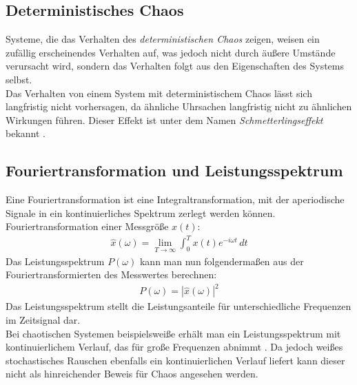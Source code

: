 \subsection{Deterministisches Chaos}
\label{sub:determChaos}
Systeme, die das Verhalten des \textit{deterministischen Chaos} zeigen, weisen ein zufällig erscheinendes Verhalten auf, was jedoch nicht durch äußere Umstände verursacht wird, sondern das Verhalten folgt aus den Eigenschaften des Systems selbst.\\
Das Verhalten von einem System mit deterministischem Chaos lässt sich langfristig nicht vorhersagen, da ähnliche Uhrsachen langfristig nicht zu ähnlichen Wirkungen führen. Dieser Effekt ist unter dem Namen \textit{Schmetterlingseffekt} bekannt \citep{WikiDetChaos}.

\subsection{Fouriertransformation und Leistungsspektrum}
\label{sub:fouriertrafo}
Eine Fouriertransformation ist eine Integraltransformation, mit der aperiodische Signale in ein kontinuierliches Spektrum zerlegt werden können.\\
Fouriertransformation einer Messgröße \(x(t)\):
\begin{gather}
    \hat{x}(\omega) = \lim_{T \to \infty} \int_{0}^{T}  x(t) e^{-i\omega t}\,dt 
\end{gather}
Das Leistungsspektrum \( P(\omega)\) kann man nun folgendermaßen aus der Fouriertransformierten des Messwertes berechnen:
\begin{gather}
    P(\omega) = |\hat{x}(\omega)|^2
\end{gather}
Das Leistungsspektrum stellt die Leistungsanteile für unterschiedliche Frequenzen im Zeitsignal dar.\\
Bei chaotischen Systemen beispielsweiße erhält man ein Leistungsspektrum mit kontinuierlichem Verlauf, das für große Frequenzen abnimmt \citep{Lueck}. Da jedoch weißes stochastisches Rauschen ebenfalls ein kontinuierlichen Verlauf liefert kann dieser nicht als hinreichender Beweis für Chaos angesehen werden.

